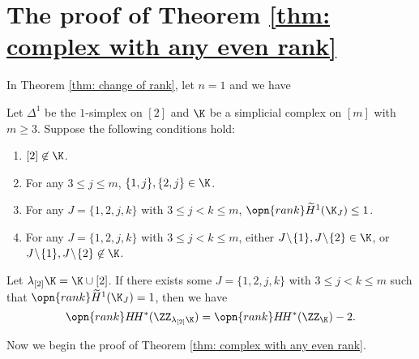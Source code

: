\section{The proof of Theorem \ref{thm: complex with any even rank}}
\label{sec: the proof of thm 2}
In Theorem \ref{thm: change of rank}, let $n=1$ and we have
\begin{prop}
    \label{prop: the change of rank n=1}
    Let $\Delta^1$ be the $1$-simplex on $[2]$ and $\K$ be a simplicial complex on $[m]$ with $m\ge 3$. Suppose the following conditions hold:
    \begin{enumerate}
    \item 
    $[2]\not\in \K$.
    \item 
    For any 
    $3\le j\le m$, 
    $\{1,j\}, \{2,j\}\in \K$. 
    \item 
    For any $J=\{1,2,j,k\}$ with $3\le j<k\le m$, 
    $\opn{rank} \widetilde{H}^1(\K_J)\le 1$.
    \item 
    For any $J=\{1,2,j,k\}$ with $3\le j<k\le m$, 
    either $J\!\setminus\! \{1\},J\!\setminus\! \{2\}\in\K$,
    or $J\!\setminus\! \{1\},J\!\setminus\! \{2\}\not\in\K$.
    \end{enumerate}
    Let $\lambda_{[2]}\K=\K\cup [2]$. If there exists some $J=\{1,2,j,k\}$ with $3\le j<k\le m$ such that $\opn{rank} \widetilde{H}^1(\K_J)=1$,
    then we have
    $$\opn{rank} H\!H^*(\ZZ_{\lambda_{[2]}\K})=\opn{rank} H\!H^*(\ZZ_{\K})-2.$$
\end{prop}
Now we begin the proof of Theorem \ref{thm: complex with any even rank}.
